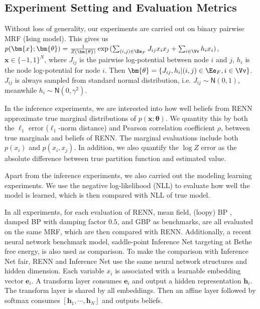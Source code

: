 \subsection{Experiment Setting and Evaluation Metrics}
\label{subsec:exp-setting}
Without loss of generality, our experiments are carried out on binary pairwise MRF (Ising model). This gives us $p(\bm{x}; \bm{\theta}) = \frac{1}{Z(\bm{\theta})}\exp{(\sum_{(i,j)\in \Ee_F} J_{ij} x_i x_j + \sum_{i\in \Vv}h_i x_i)}$, $\bm{x} \in \{-1, 1\}^{N}$, where $J_{ij}$ is the pairwise log-potential between node $i$ and $j$, $h_i$ is the node log-potential for node $i$. Then $\bm{\theta} = \left\{ J_{ij}, h_i| (i,j) \in \Ee_F, i \in \Vv \right\}$. $J_{ij}$ is always sampled from standard normal distribution, i.e. $J_{ij}\sim \mathsf{N}(0,1)$, meanwhile $h_i \sim \mathsf{N}(0, \gamma^{2})$.

In the inference experiments, we are interested into how well beliefs from RENN approximate true marginal distributions of $p(\bm{x};\bm{\theta})$. We quantity this by both the $\ell_1$ error ($\ell_1$-norm distance) and Pearson correlation coefficient $\rho$, between true marginals and beliefs of RENN. The marginal evaluations include both $p(x_i)$ and $p(x_i,x_j)$. In addition, we also quantify the $\log{Z}$ error as the absolute difference between true partition function and estimated value.

Apart from the inference experiments, we also carried out the modeling learning experiments. We use the negative log-likelihood (NLL) to evaluate how well the model is learned, which is then compared with NLL of true model.

In all experiments, for each evaluation of RENN, mean field, (loopy) BP \cite{mooij2007sufficient}, damped BP \cite{Pretti2005damping} with damping factor $0.5$, and GBP \cite{yedida2005constucting} as benchmarks, are all evaluated on the same MRF, which are then compared with RENN. Additionally, a recent neural network benchmark model, saddle-point Inference Net \cite{NIPS2019_9687} targeting at Bethe free energy, is also used as comparison. To make the comparison with Inference Net fair, RENN and Inference Net use the same neural network structures and hidden dimension. Each variable $x_i$ is associated with a learnable embedding vector $\bm{e}_i$. A transform layer \cite{AshishNIPS2017_7181} consumes $\bm{e}_i$ and output a hidden representation $\bm{h}_i$. The transform layer is shared by all embeddings. Then an affine layer followed by softmax consumes $[\bm{h}_1, \cdots, \bm{h}_N]$ and outputs beliefs.

